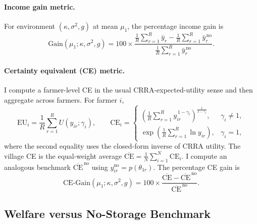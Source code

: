 \paragraph{Income gain metric.}
For environment $(\kappa,\sigma^2,g)$ at mean $\mu_1$, the percentage income gain is
$$
\mathrm{Gain}(\mu_1;\kappa,\sigma^2,g)
=100\times
\frac{\frac{1}{R}\sum_{r=1}^R \bar y_{r}-\frac{1}{R}\sum_{r=1}^R \bar y^{\,\text{no}}_{r}}
{\frac{1}{R}\sum_{r=1}^R \bar y^{\,\text{no}}_{r}}.
$$

\paragraph{Certainty equivalent (CE) metric.}
I compute a farmer-level CE in the usual CRRA-expected-utility sense and then aggregate across farmers. For farmer $i$,
$$
\mathrm{EU}_i
=\frac{1}{R}\sum_{r=1}^R U(y_{ir};\gamma_i),
\qquad
\mathrm{CE}_i=
\begin{cases}
\left(\frac{1}{R}\sum_{r=1}^R y_{ir}^{\,1-\gamma_i}\right)^{\!\!\frac{1}{1-\gamma_i}}, & \gamma_i\neq 1,\\[8pt]
\exp\!\left(\frac{1}{R}\sum_{r=1}^R \ln y_{ir}\right), & \gamma_i=1,
\end{cases}
$$
where the second equality uses the closed-form inverse of CRRA utility. The village CE is the equal-weight average $\overline{\mathrm{CE}}=\frac{1}{N}\sum_{i=1}^N \mathrm{CE}_i$. I compute an analogous benchmark $\overline{\mathrm{CE}}^{\,\text{no}}$ using $y^{\text{no}}_{ir}=p(\theta_{1r})$. The percentage CE gain is
$$
\mathrm{CE\text{-}Gain}(\mu_1;\kappa,\sigma^2,g)
=100\times
\frac{\overline{\mathrm{CE}}-\overline{\mathrm{CE}}^{\,\text{no}}}{\overline{\mathrm{CE}}^{\,\text{no}}}.
$$


\subsection{Welfare versus No-Storage Benchmark}

